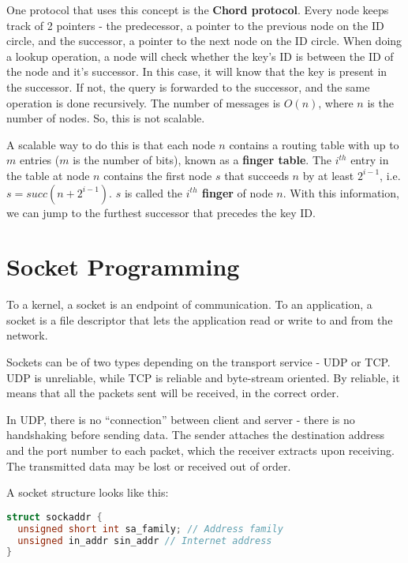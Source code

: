 \documentclass[12pt,letterpaper]{article}
\theoremstyle{definition}
\begin{document}
One protocol that uses this concept is the \textbf{Chord protocol}. Every node keeps track of 2 pointers - the predecessor, a pointer to the previous node on the ID circle, and the successor, a pointer to the next node on the ID circle. When doing a lookup operation, a node will check whether the key's ID is between the ID of the node and it's successor. In this case, it will know that the key is present in the successor. If not, the query is forwarded to the successor, and the same operation is done recursively. The number of messages is $O(n)$, where $n$ is the number of nodes. So, this is not scalable.

A scalable way to do this is that each node $n$ contains a routing table with up to $m$ entries ($m$ is the number of bits), known as a \textbf{finger table}. The $i^{th}$ entry in the table at node $n$ contains the first node $s$ that succeeds $n$ by at least $2^{i-1}$, i.e. $s = succ(n+2^{i-1})$. $s$ is called the \textbf{ $i^{th}$ finger} of node $n$. With this information, we can jump to the furthest successor that precedes the key ID.

\section{Socket Programming}

To a kernel, a socket is an endpoint of communication. To an application, a socket is a file descriptor that lets the application read or write to and from the network.

Sockets can be of two types depending on the transport service - UDP or TCP. UDP is unreliable, while TCP is reliable and byte-stream oriented. By reliable, it means that all the packets sent will be received, in the correct order. 

In UDP, there is no ``connection'' between client and server - there is no handshaking before sending data. The sender attaches the destination address and the port number to each packet, which the receiver extracts upon receiving. The transmitted data may be lost or received out of order.

A socket structure looks like this:

\begin{lstlisting}[language=C]
struct sockaddr {
  unsigned short int sa_family; // Address family
  unsigned in_addr sin_addr // Internet address
}
\end{lstlisting}
\end{document}

